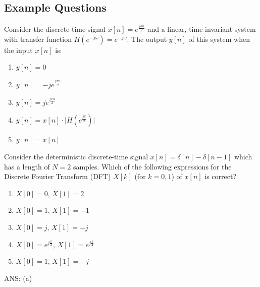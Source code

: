 \subsection{Example Questions}
\begin{q}{}
Consider the discrete-time signal $x[n] = e^{\frac{j\pi n}{2}}$ and a linear, time-invariant system with transfer function $H(e^{-j\omega}) = e^{-j \omega}$. The output $y[n]$ of this system when the input $x[n]$ is:

\begin{enumerate}[label=(\alph*)]
    \item $y[n] = 0$
    \item $y[n] = -je^{\frac{j\pi n}{2}}$
    \item $y[n] = je^{\frac{j\pi n}{2}}$
    \item $y[n] = x[n] \cdot \lvert H(e^{\frac{j \pi}{2}})\rvert$
    \item $y[n] = x[n]$
\end{enumerate}
\end{q}
\begin{q}{}
Consider the deterministic discrete-time signal $x[n] = \delta[n] - \delta[n-1]$ which has a length of $N = 2$ samples. Which of the following expressions for the Discrete Fourier Transform (DFT) $X[k]$ (for $k = 0, 1$) of $x[n]$ is correct?

\begin{enumerate}[label=(\alph*)]
    \item $X[0] = 0, \, X[1] = 2$
    \item $X[0] = 1, \, X[1] = -1$
    \item $X[0] = j, \, X[1] = -j$
    \item $X[0] = e^{j\frac{\pi}{3}}, \, X[1] = e^{j\frac{\pi}{4}}$
    \item $X[0] = 1, \, X[1] = -j$
\end{enumerate}
\begin{flushright}
    \begin{blueenv}
        ANS: (a)
    \end{blueenv}
\end{flushright}
\end{q}
